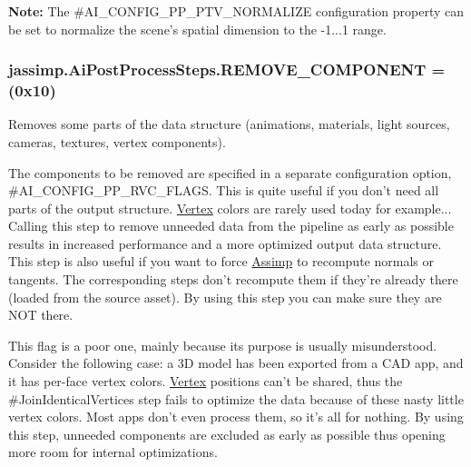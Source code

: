 {{\bfseries Note\+:} The {\ttfamily \#\+A\+I\+\_\+\+C\+O\+N\+F\+I\+G\+\_\+\+P\+P\+\_\+\+P\+T\+V\+\_\+\+N\+O\+R\+M\+A\+L\+I\+Z\+E} configuration property can be set to normalize the scene's spatial dimension to the -\/1...1 range. \hypertarget{enumjassimp_1_1_ai_post_process_steps_a323a9c21d2f21f01d3690c3fdee351e8}{
\subsubsection[{R\+E\+M\+O\+V\+E\+\_\+\+C\+O\+M\+P\+O\+N\+E\+N\+T}]{\setlength{\rightskip}{0pt plus 5cm}jassimp.\+Ai\+Post\+Process\+Steps.\+R\+E\+M\+O\+V\+E\+\_\+\+C\+O\+M\+P\+O\+N\+E\+N\+T =(0x10)}}\label{enumjassimp_1_1_ai_post_process_steps_a323a9c21d2f21f01d3690c3fdee351e8}
Removes some parts of the data structure (animations, materials, light sources, cameras, textures, vertex components).

The components to be removed are specified in a separate configuration option, {\ttfamily \#\+A\+I\+\_\+\+C\+O\+N\+F\+I\+G\+\_\+\+P\+P\+\_\+\+R\+V\+C\+\_\+\+F\+L\+A\+G\+S}. This is quite useful if you don't need all parts of the output structure. \hyperlink{struct_vertex}{Vertex} colors are rarely used today for example... Calling this step to remove unneeded data from the pipeline as early as possible results in increased performance and a more optimized output data structure. This step is also useful if you want to force \hyperlink{class_assimp}{Assimp} to recompute normals or tangents. The corresponding steps don't recompute them if they're already there (loaded from the source asset). By using this step you can make sure they are N\+O\+T there. 

This flag is a poor one, mainly because its purpose is usually misunderstood. Consider the following case\+: a 3\+D model has been exported from a C\+A\+D app, and it has per-\/face vertex colors. \hyperlink{struct_vertex}{Vertex} positions can't be shared, thus the \#\+Join\+Identical\+Vertices step fails to optimize the data because of these nasty little vertex colors. Most apps don't even process them, so it's all for nothing. By using this step, unneeded components are excluded as early as possible thus opening more room for internal optimizations. \hypertarget{enumjassimp_1_1_ai_post_process_steps_a7de1d3d57df60b08b9484e6055c1b309}{
}}

